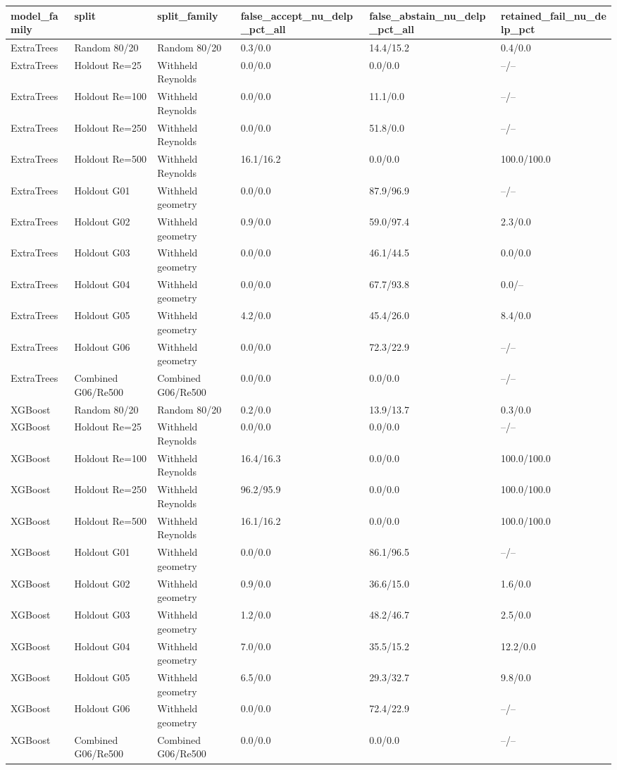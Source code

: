 \begin{tabular}{llllll}
\hline
model_family & split & split_family & false_accept_nu_delp_pct_all & false_abstain_nu_delp_pct_all & retained_fail_nu_delp_pct \\
\hline
ExtraTrees & Random 80/20 & Random 80/20 & 0.3/0.0 & 14.4/15.2 & 0.4/0.0 \\
ExtraTrees & Holdout Re=25 & Withheld Reynolds & 0.0/0.0 & 0.0/0.0 & --/-- \\
ExtraTrees & Holdout Re=100 & Withheld Reynolds & 0.0/0.0 & 11.1/0.0 & --/-- \\
ExtraTrees & Holdout Re=250 & Withheld Reynolds & 0.0/0.0 & 51.8/0.0 & --/-- \\
ExtraTrees & Holdout Re=500 & Withheld Reynolds & 16.1/16.2 & 0.0/0.0 & 100.0/100.0 \\
ExtraTrees & Holdout G01 & Withheld geometry & 0.0/0.0 & 87.9/96.9 & --/-- \\
ExtraTrees & Holdout G02 & Withheld geometry & 0.9/0.0 & 59.0/97.4 & 2.3/0.0 \\
ExtraTrees & Holdout G03 & Withheld geometry & 0.0/0.0 & 46.1/44.5 & 0.0/0.0 \\
ExtraTrees & Holdout G04 & Withheld geometry & 0.0/0.0 & 67.7/93.8 & 0.0/-- \\
ExtraTrees & Holdout G05 & Withheld geometry & 4.2/0.0 & 45.4/26.0 & 8.4/0.0 \\
ExtraTrees & Holdout G06 & Withheld geometry & 0.0/0.0 & 72.3/22.9 & --/-- \\
ExtraTrees & Combined G06/Re500 & Combined G06/Re500 & 0.0/0.0 & 0.0/0.0 & --/-- \\
XGBoost & Random 80/20 & Random 80/20 & 0.2/0.0 & 13.9/13.7 & 0.3/0.0 \\
XGBoost & Holdout Re=25 & Withheld Reynolds & 0.0/0.0 & 0.0/0.0 & --/-- \\
XGBoost & Holdout Re=100 & Withheld Reynolds & 16.4/16.3 & 0.0/0.0 & 100.0/100.0 \\
XGBoost & Holdout Re=250 & Withheld Reynolds & 96.2/95.9 & 0.0/0.0 & 100.0/100.0 \\
XGBoost & Holdout Re=500 & Withheld Reynolds & 16.1/16.2 & 0.0/0.0 & 100.0/100.0 \\
XGBoost & Holdout G01 & Withheld geometry & 0.0/0.0 & 86.1/96.5 & --/-- \\
XGBoost & Holdout G02 & Withheld geometry & 0.9/0.0 & 36.6/15.0 & 1.6/0.0 \\
XGBoost & Holdout G03 & Withheld geometry & 1.2/0.0 & 48.2/46.7 & 2.5/0.0 \\
XGBoost & Holdout G04 & Withheld geometry & 7.0/0.0 & 35.5/15.2 & 12.2/0.0 \\
XGBoost & Holdout G05 & Withheld geometry & 6.5/0.0 & 29.3/32.7 & 9.8/0.0 \\
XGBoost & Holdout G06 & Withheld geometry & 0.0/0.0 & 72.4/22.9 & --/-- \\
XGBoost & Combined G06/Re500 & Combined G06/Re500 & 0.0/0.0 & 0.0/0.0 & --/-- \\
\hline
\end{tabular}
